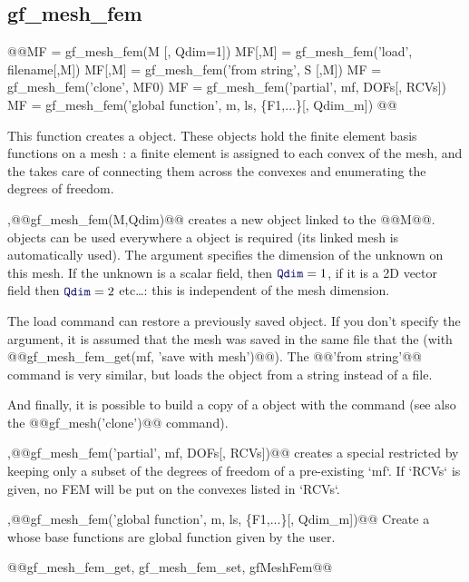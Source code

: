 \subsection{gf\_mesh\_fem}
\begin{synopsis}
@@\tmf MF = gf\_mesh\_fem(\tmesh M [, \tint Qdim=1])
\tmf MF[,M] = gf\_mesh\_fem('load', \tstr filename[,\tmesh M])
\tmf MF[,M] = gf\_mesh\_fem('from string', \tstr S [,\tmesh M])
\tmf MF = gf\_mesh\_fem('clone', \tmf MF0)
\tmf MF = gf\_mesh\_fem('partial', \tmf mf, \tivec DOFs[, \tivec RCVs])
\tmf MF = gf\_mesh\_fem('global function', \tmesh m, \tls ls, \{\tgl F1,...\}[, \tint Qdim_m])
@@\end{synopsis}
\begin{cmddescription}
  This function creates a \tmf object. These objects hold the finite
  element basis functions on a mesh : a finite element is assigned
  to each convex of the mesh, and the \tmf takes care of connecting
  them across the convexes and enumerating the degrees of freedom.


  \sep{@@gf\_mesh\_fem(M,Qdim)@@} creates a new \tmf object linked to the
  \tmesh @@M@@. \tmf objects can be used everywhere a \tcmesh object
  is required (its linked mesh is automatically used). The argument
   specifies the dimension of the unknown on this
  mesh. If the unknown is a scalar field, then $\kw{Qdim}=1$, if it is
  a 2D vector field then $\kw{Qdim}=2$ etc\ldots: this is independent of
  the mesh dimension.
  
  The load command can restore a previously saved \tmf object. If you don't
  specify the \tmesh argument, it is assumed that the mesh was saved in the
  same file that the \tmf (with @@gf\_mesh\_fem\_get(mf, 'save with mesh')@@). The
  @@'from string'@@ command is very similar, but loads the object from a string
  instead of a file.

  And finally, it is possible to build a copy of a \tmf object with
  the  command (see also the
  @@gf_mesh('clone')@@ command).

  \sep{@@gf\_mesh\_fem('partial', \tmf mf, \tivec DOFs[, \tivec
    RCVs])@@} creates a special restricted \tmf by keeping only a
    subset of the degrees of freedom of a pre-existing \tmf `mf`.
    If `RCVs` is given, no FEM will be put on the convexes listed in `RCVs`.

  \sep{@@gf\_mesh\_fem('global function', \tmesh m, \tls ls, \{\tgl F1,...\}[,    \tint Qdim_m])@@}  Create a \tmf whose base functions are global
    function given by the user.
\end{cmddescription}
\begin{gfseealso}
  @@gf\_mesh\_fem\_get, gf\_mesh\_fem\_set, gfMeshFem@@
\end{gfseealso}
\newpage



